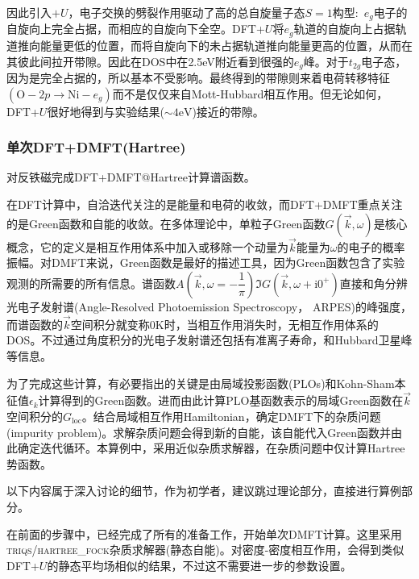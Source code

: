 因此引入$+U$，电子交换的劈裂作用驱动了高的总自旋量子态$S=1$构型:~$e_g$电子的自旋向上完全占据，而相应的自旋向下全空。\textrm{DFT+}$U$将$e_g$轨道的自旋向上占据轨道推向能量更低的位置，而将自旋向下的未占据轨道推向能量更高的位置，从而在其彼此间拉开带隙。因此在\textrm{DOS}中在\textrm{2.5eV}附近看到很强的$e_g$峰。对于$t_{2g}$电子态，因为是完全占据的，所以基本不受影响。最终得到的带隙则来着电荷转移特征$(\mathrm{O}-2p\rightarrow\mathrm{Ni}-e_g)$而不是仅仅来自\textrm{Mott-Hubbard}相互作用。但无论如何，\textrm{DFT+}$U$很好地得到与实验结果($\sim4\mathrm{eV}$)接近的带隙。

\subsubsection{单次\rm{DFT+DMFT}\textrm{(Hartree)}}
对反铁磁完成\textrm{DFT+DMFT@Hartree}计算谱函数。

在\textrm{DFT}计算中，自洽迭代关注的是能量和电荷的收敛，而\textrm{DFT+DMFT}重点关注的是\textrm{Green}函数和自能的收敛。在多体理论中，单粒子\textrm{Green}函数$G(\vec k,\omega)$是核心概念，它的定义是相互作用体系中加入或移除一个动量为$\vec k$能量为$\omega$的电子的概率振幅。对\textrm{DMFT}来说，\textrm{Green}函数是最好的描述工具，因为\textrm{Green}函数包含了实验观测的所需要的所有信息。谱函数$A(\vec k,\omega=-\dfrac1{\pi})\Im G(\vec k,\omega+\mathrm{i}0^+)$直接和角分辨光电子发射谱\textrm{(Angle-Resolved Photoemission Spectroscopy， ARPES)}的峰强度，而谱函数的$\vec k$空间积分就变称\textrm{0K}时，当相互作用消失时，无相互作用体系的\textrm{DOS}。不过通过角度积分的光电子发射谱还包括有准离子寿命，和\textrm{Hubbard}卫星峰等信息。

为了完成这些计算，有必要指出的关键是由局域投影函数\textrm{(PLOs)}和\textrm{Kohn-Sham}本征值$\epsilon_k$计算得到的\textrm{Green}函数。进而由此计算\textrm{PLO}基函数表示的局域\textrm{Green}函数在$\vec k$空间积分的$G_{\mathrm{loc}}$。结合局域相互作用\textrm{Hamiltonian}，确定\textrm{DMFT}下的杂质问题\textrm{(impurity problem)}。求解杂质问题会得到新的自能，该自能代入\textrm{Green}函数并由此确定迭代循环。本算例中，采用近似杂质求解器，在杂质问题中仅计算\textrm{Hartree}势函数。

以下内容属于深入讨论的细节，作为初学者，建议跳过理论部分，直接进行算例部分。

在前面的步骤中，已经完成了所有的准备工作，开始单次\textrm{DMFT}计算。这里采用\textsc{triqs/hartree\_fock}杂质求解器(静态自能)。对密度-密度相互作用，会得到类似\textrm{DFT+}$U$的静态平均场相似的结果，不过这不需要进一步的参数设置。

